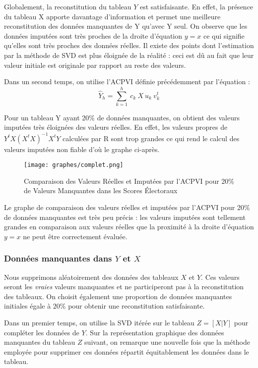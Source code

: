 \documentclass[12pt, openany, fleqn, french]{article}
\begin{document}
Globalement, la reconstitution du tableau $Y$ est satisfaisante. En effet, la présence du tableau X apporte davantage d'information et permet une meilleure reconstitution des données manquantes de Y qu'avec Y seul. On observe que les données imputées sont très proches de la droite d'équation $y=x$ ce qui signifie qu'elles sont très proches des données réelles. Il existe des points dont l'estimation par la méthode de SVD est plus éloignée de la réalité : ceci est dû au fait que leur valeur initiale est originale par rapport au reste des valeurs. 

Dans un second temps, on utilise l'ACPVI définie précédemment par l'équation :
$$\hat{Y}_h = \sum_{k=1}^h~c_k~X~u_k~v_k^t$$

Pour un tableau Y ayant 20\% de données manquantes, on obtient des valeurs imputées très éloignées des valeurs réelles. En effet, les valeurs propres de $Y^tX(X^tX)^{-1}X^t Y$ calculées par R sont trop grandes ce qui rend le calcul des valeurs imputées non fiable d'où le graphe ci-après.

\begin{center}
\begin{figure}[H]
\centering
  \texttt{[image: graphes/complet.png]}
  \caption{Comparaison des Valeurs Réelles et Imputées par l'ACPVI pour 20\% de Valeurs Manquantes dans les Scores Électoraux}
\end{figure}
\end{center}

Le graphe de comparaison des valeurs réelles et imputées par l'ACPVI pour 20\% de données manquantes est très peu précis : les valeurs imputées sont tellement grandes en comparaison aux valeurs réelles que la proximité à la droite d'équation $y=x$ ne peut être correctement évaluée. 


\subsubsection{Données manquantes dans $Y$ et $X$}

Nous supprimons aléatoirement des données des tableaux $X$ et $Y$. Ces valeurs seront les \textit{vraies} valeurs manquantes et ne participeront pas à la reconstitution des tableaux. On choisit également une proportion de données manquantes initiales égale à 20\% pour obtenir une reconstitution satisfaisante.

Dans un premier temps, on utilise la SVD itérée sur le tableau $Z=[X|Y]$ pour compléter les données de $Y$. Sur la représentation graphique des données manquantes du tableau $Z$ suivant, on remarque une nouvelle fois que la méthode employée pour supprimer ces données répartit équitablement les données dans le tableau.
\end{document}
